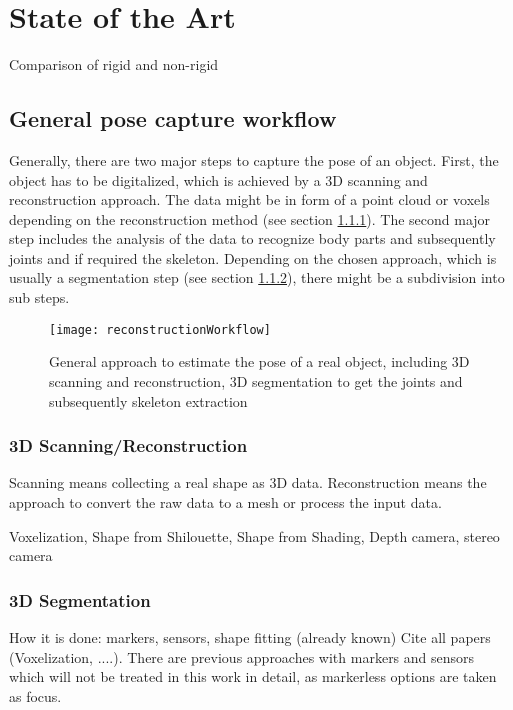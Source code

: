\chapter{State of the Art}
\label{cha:StateOfTheArt}

Comparison of rigid and non-rigid\cite{survey}

\section{General pose capture workflow}
\label{PoseCapture}
Generally, there are two major steps to capture the pose of an object. First, the object has to be digitalized, which is achieved by a 3D scanning and reconstruction approach. The data might be in form of a point cloud or voxels depending on the reconstruction method (see section \ref{sec:reconstruction}). The second major step includes the analysis of the data to recognize body parts and subsequently joints and if required the skeleton. Depending on the chosen approach, which is usually a segmentation step (see section \ref{sec:segmentation}), there might be a subdivision into sub steps.
%
%
\begin{figure}
	\centering
	\texttt{[image: reconstructionWorkflow]}
	\caption{General approach to estimate the pose of a real object, including 3D scanning and reconstruction, 3D segmentation to get the joints and subsequently skeleton extraction}
	\label{fig:posecapture}
\end{figure}
%
\subsection{3D Scanning/Reconstruction}
\label{sec:reconstruction}
%
%
Scanning means collecting a real shape as 3D data. Reconstruction means the approach to convert the raw data to a mesh or process the input data.

Voxelization, Shape from Shilouette, Shape from Shading, Depth camera, stereo camera
%
%
\subsection{3D Segmentation}
\label{sec:segmentation}
%
%
How it is done: markers, sensors, shape fitting (already known)
Cite all papers (Voxelization, ....). There are previous approaches with markers and sensors which will not be treated in this work in detail, as markerless options are taken as focus.

